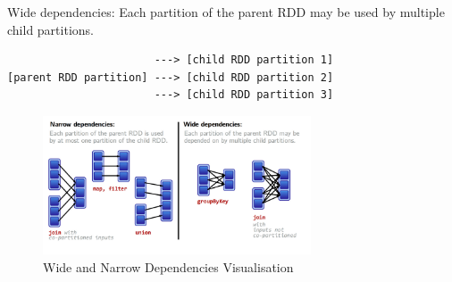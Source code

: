 \documentclass[]{article}
\begin{document}
Wide dependencies: Each partition of the parent RDD may be used by
multiple child partitions.

\begin{verbatim}
                       ---> [child RDD partition 1]
[parent RDD partition] ---> [child RDD partition 2]
                       ---> [child RDD partition 3]
\end{verbatim}

\begin{figure}[h]

{\centering \includegraphics[width=300px]{images/Dependencies} 

}

\caption{\label{fig:figs}Wide and Narrow Dependencies Visualisation}\label{fig:unnamed-chunk-13}
\end{figure}
\end{document}
